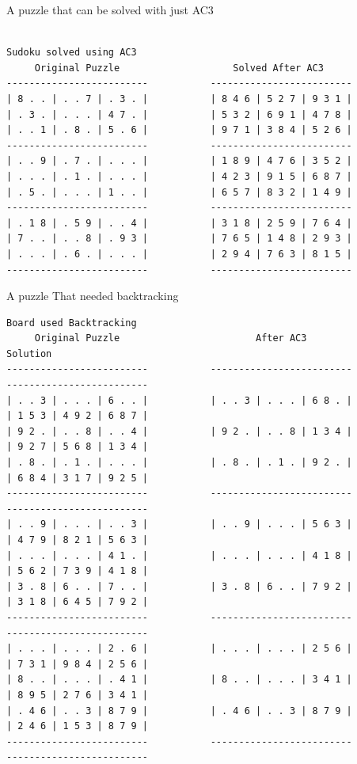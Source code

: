 \documentclass{article}
\begin{document}
A puzzle that can be solved with just AC3
\begin{verbatim}

Sudoku solved using AC3
     Original Puzzle                    Solved After AC3     
-------------------------           -------------------------
| 8 . . | . . 7 | . 3 . |           | 8 4 6 | 5 2 7 | 9 3 1 | 
| . 3 . | . . . | 4 7 . |           | 5 3 2 | 6 9 1 | 4 7 8 | 
| . . 1 | . 8 . | 5 . 6 |           | 9 7 1 | 3 8 4 | 5 2 6 | 
-------------------------           -------------------------
| . . 9 | . 7 . | . . . |           | 1 8 9 | 4 7 6 | 3 5 2 | 
| . . . | . 1 . | . . . |           | 4 2 3 | 9 1 5 | 6 8 7 | 
| . 5 . | . . . | 1 . . |           | 6 5 7 | 8 3 2 | 1 4 9 | 
-------------------------           -------------------------
| . 1 8 | . 5 9 | . . 4 |           | 3 1 8 | 2 5 9 | 7 6 4 | 
| 7 . . | . . 8 | . 9 3 |           | 7 6 5 | 1 4 8 | 2 9 3 | 
| . . . | . 6 . | . . . |           | 2 9 4 | 7 6 3 | 8 1 5 | 
-------------------------           -------------------------

\end{verbatim}
A puzzle That needed backtracking
\begin{verbatim}
Board used Backtracking
     Original Puzzle                        After AC3                           Solution         
-------------------------           -------------------------           -------------------------
| . . 3 | . . . | 6 . . |           | . . 3 | . . . | 6 8 . |           | 1 5 3 | 4 9 2 | 6 8 7 | 
| 9 2 . | . . 8 | . . 4 |           | 9 2 . | . . 8 | 1 3 4 |           | 9 2 7 | 5 6 8 | 1 3 4 | 
| . 8 . | . 1 . | . . . |           | . 8 . | . 1 . | 9 2 . |           | 6 8 4 | 3 1 7 | 9 2 5 | 
-------------------------           -------------------------           -------------------------
| . . 9 | . . . | . . 3 |           | . . 9 | . . . | 5 6 3 |           | 4 7 9 | 8 2 1 | 5 6 3 | 
| . . . | . . . | 4 1 . |           | . . . | . . . | 4 1 8 |           | 5 6 2 | 7 3 9 | 4 1 8 | 
| 3 . 8 | 6 . . | 7 . . |           | 3 . 8 | 6 . . | 7 9 2 |           | 3 1 8 | 6 4 5 | 7 9 2 | 
-------------------------           -------------------------           -------------------------
| . . . | . . . | 2 . 6 |           | . . . | . . . | 2 5 6 |           | 7 3 1 | 9 8 4 | 2 5 6 | 
| 8 . . | . . . | . 4 1 |           | 8 . . | . . . | 3 4 1 |           | 8 9 5 | 2 7 6 | 3 4 1 | 
| . 4 6 | . . 3 | 8 7 9 |           | . 4 6 | . . 3 | 8 7 9 |           | 2 4 6 | 1 5 3 | 8 7 9 | 
-------------------------           -------------------------           -------------------------
\end{verbatim}
\end{document}
